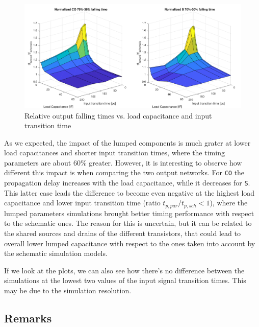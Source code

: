 \documentclass[a4paper]{article}
\begin{document}
\begin{figure}[ht]
	\includegraphics[width=\linewidth]{Images/HA/t_F_diff_crop.pdf}
	\caption{Relative output falling times vs. load capacitance and input transition time}
	\label{fig:HA_t_F_diff}
\end{figure}

As we expected, the impact of the lumped components is much grater at lower load capacitances and shorter input transition times, where the timing parameters are about 60\% greater. However, it is interesting to observe how different this impact is when comparing the two output networks. For \texttt{CO} the propagation delay increases with the load capacitance, while it decreases for \texttt{S}. This latter case leads the difference to become even negative at the highest load capacitance and lower input transition time (ratio $t_{p, par}/t_{p, sch} < 1$), where the lumped parameters simulations brought better timing performance with respect to the schematic ones. The reason for this is uncertain, but it can be related to the shared sources and drains of the different transistors, that could lead to overall lower lumped capacitance with respect to the ones taken into account by the schematic simulation models.

If we look at the plots, we can also see how there's no difference between the simulations at the lowest two values of the input signal transition times. This may be due to the simulation resolution.

\subsection{Remarks}
\end{document}

